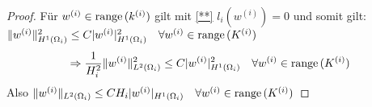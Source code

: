 \begin{proof}
  Für $w^{(i)}\in\textnormal{range}\,(k^{(i)})$ gilt mit \eqref{**} $l_i(w^{(i)})=0$ und somit gilt: $\|w^{(i)}\|_{H^1(\Omega_i)}^2 \leq C|w^{(i)}|_{H^1(\Omega_i)}^2 \quad \forall w^{(i)}\in\textnormal{range}\,(K^{(i)})$
  \[
    \Rightarrow \frac{1}{H_i^2} \|w^{(i)}\|_{L^2(\Omega_i)}^2 \leq C |w^{(i)}|_{H^1(\Omega_i)}^2 \quad \forall w^{(i)}\in\textnormal{range}\,(K^{(i)})
  \]
  Also $\|w^{(i)}\|_{L^2(\Omega_i)} \leq CH_i |w^{(i)}|_{H^1(\Omega_i)} \quad \forall w^{(i)}\in\textnormal{range}\,(K^{(i)})$

\end{proof}
